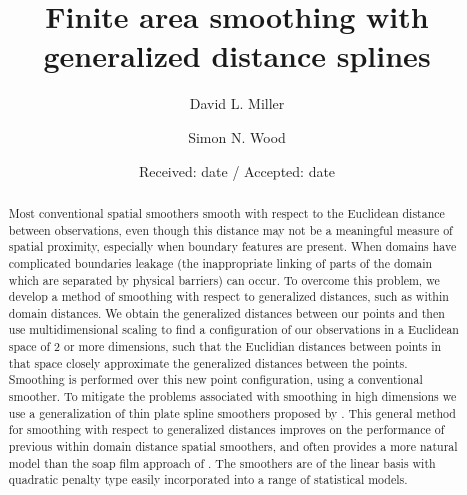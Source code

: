 \documentclass[smallextended]{svjour3}       %
\begin{document}
\title{Finite area smoothing with generalized distance splines}


\author{David L. Miller         \and
        Simon N. Wood
}



\date{Received: date / Accepted: date}


\maketitle

\begin{abstract}
Most conventional spatial smoothers smooth with respect to the Euclidean distance between observations, even though this distance may not be a meaningful measure of spatial proximity, especially when boundary features are present. When domains have complicated boundaries leakage (the inappropriate linking of parts of the domain which are separated by physical barriers) can occur. To overcome this problem, we develop a method of smoothing with respect to generalized distances, such as within domain distances. We obtain the generalized distances between our points and then use multidimensional scaling to find a configuration of our observations in a Euclidean space of 2 or more dimensions, such that the Euclidian distances between points in that space closely approximate the generalized distances between the points. Smoothing is performed over this new point configuration, using a conventional smoother. To mitigate the problems associated with smoothing in high dimensions we use a generalization of thin plate spline smoothers proposed by \cite{Duchon:1977tr}. This general method for smoothing with respect to generalized distances improves on the performance of previous within domain distance spatial smoothers, and often provides a more natural model than the soap film approach of \cite{Wood:2008vo}. The smoothers are of the linear basis with quadratic penalty type easily incorporated into a range of statistical models.
\end{abstract}
\end{document}
